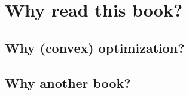 \chapter*{Why read this book?}
\label{chap:why_this_book}

\SkipTocEntry\section*{Why (convex) optimization?}




\SkipTocEntry\section*{Why another book?}



